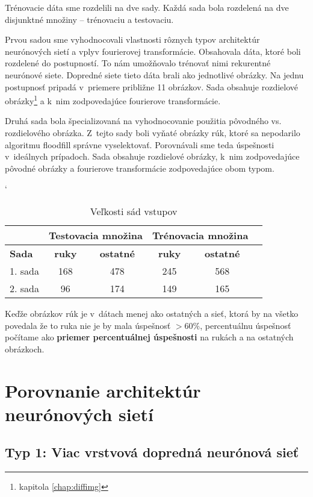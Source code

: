 Trénovacie dáta sme rozdelili na dve sady. Každá sada bola rozdelená na dve disjunktné množiny -- trénovaciu a testovaciu. 

Prvou sadou sme vyhodnocovali vlastnosti rôznych typov architektúr neurónových sietí a vplyv fourierovej transformácie. Obsahovala dáta, ktoré boli rozdelené do postupností. To nám umožňovalo trénovať nimi rekurentné neurónové siete. Dopredné siete tieto dáta brali ako jednotlivé obrázky. Na jednu postupnosť pripadá v~priemere približne 11 obrázkov. Sada obsahuje rozdielové obrázky\footnote{kapitola \ref{chap:diffimg}} a k~nim zodpovedajúce fourierove transformácie.

Druhá sada bola špecializovaná na vyhodnocovanie použitia pôvodného vs. rozdielového obrázka. Z~tejto sady boli vyňaté obrázky rúk, ktoré sa nepodarilo algoritmu floodfill správne vyselektovať. Porovnávali sme teda úspešnosti v~ideálnych prípadoch. Sada obsahuje rozdielové obrázky, k~nim zodpovedajúce pôvodné obrázky a fourierove transformácie zodpovedajúce obom typom.

\begin{table}[h]
\catcode` %
\centering
\begin{tabular}{|l|c|c|c|c|c|}
\cline{2-5}
\multicolumn{1}{l}{} & \multicolumn{2}{|c|}{\textbf{Testovacia množina}} & \multicolumn{2}{c|}{\textbf{Trénovacia množina}}\\ 
\hline
\textbf{Sada} & \textbf{ruky} & \textbf{ostatné} & \textbf{ruky} & \textbf{ostatné} \\ \hline
1. sada & 168 & 478 & 245  & 568 \\ \hline
2. sada & 96 & 174 & 149 & 165 \\ 
\hline
\end{tabular}
\caption{Veľkosti sád vstupov}
\label{tab:neuroncountcmp}
\end{table}

Keďže obrázkov rúk je v~dátach menej ako ostatných a sieť, ktorá by na všetko povedala že to ruka nie je by mala úspešnosť $>60\%$, percentuálnu úspešnosť počítame ako \textbf{priemer percentuálnej úspešnosti} na rukách a na ostatných obrázkoch.

\section{Porovnanie architektúr neurónových sietí}

\subsection{Typ 1: Viac vrstvová dopredná neurónová sieť}

